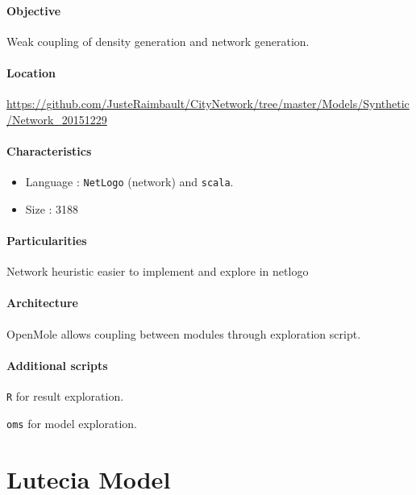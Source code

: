 \paragraph{Objective}

Weak coupling of density generation and network generation.

\paragraph{Location}

\url{https://github.com/JusteRaimbault/CityNetwork/tree/master/Models/Synthetic/Network_20151229}

\paragraph{Characteristics}

\begin{itemize}
\item Language : \texttt{NetLogo} (network) and \texttt{scala}.
\item Size : 3188
\end{itemize}


\paragraph{Particularities}

Network heuristic easier to implement and explore in netlogo

\paragraph{Architecture}

OpenMole allows coupling between modules through exploration script.

\paragraph{Additional scripts}

\texttt{R} for result exploration.

\texttt{oms} for model exploration.







\section{Lutecia Model}

